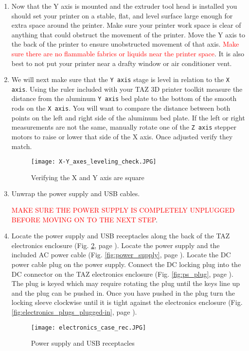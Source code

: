 \begin{enumerate}
\item Now that the Y axis is mounted and the extruder tool head is installed you should set your printer on a stable, flat, and level surface large enough for extra space around the printer. Make sure your printer work space is clear of anything that could obstruct the movement of the printer. Move the Y axis to the back of the printer to ensure unobstructed movement of that axis. \textcolor{red}{Make sure there are no flammable fabrics or liquids near the printer space}. It is also best to not put your printer near a drafty window or air conditioner vent.

\item We will next make sure that the \texttt{Y axis} stage is level in relation to the \texttt{X axis}. Using the ruler included with your TAZ 3D printer toolkit measure the distance from the aluminum \texttt{Y axis} bed plate to the bottom of the smooth rods on the \texttt{X axis}. You will want to compare the distance between both points on the left and right side of the aluminum bed plate. If the left or right measurements are not the same, manually rotate one of the \texttt{Z axis} stepper motors to raise or lower that side of the X axis. Once adjusted verify they match.
\begin{figure}[H]
\centering
\texttt{[image: X-Y\_axes\_leveling\_check.JPG]}
\caption{Verifying the X and Y axis are square}
\label{fig:X-Y_axes_leveling_check}
\end{figure}  

\item Unwrap the power supply and USB cables.

\textcolor{red}{MAKE SURE THE POWER SUPPLY IS COMPLETELY UNPLUGGED BEFORE MOVING ON TO THE NEXT STEP}.

\item Locate the power supply and USB receptacles along the back of the TAZ electronics enclosure
(Fig. \ref{fig:electronics_plugs}, page \pageref{fig:electronics_plugs}). Locate the power supply and the included AC power cable (Fig. \ref{fig:power_supply}, page \pageref{fig:power_supply}). Locate the DC power cable plug on the power supply. Connect the DC locking plug into the DC connector on the TAZ electronics enclosure (Fig. \ref{fig:ps_plug}, page \pageref{fig:ps_plug}). The plug is keyed which may require rotating the plug until the keys line up and the plug can be pushed in. Once you have pushed in the plug turn the locking sleeve clockwise until it is tight against the electronics enclosure (Fig. \ref{fig:electronics_plugs_plugged-in}, page \pageref{fig:electronics_plugs_plugged-in}).
\begin{figure}[H]
\centering
\texttt{[image: electronics\_case\_rec.JPG]}
\caption{Power supply and USB receptacles}
\label{fig:electronics_plugs}
\end{figure}


\end{enumerate}
